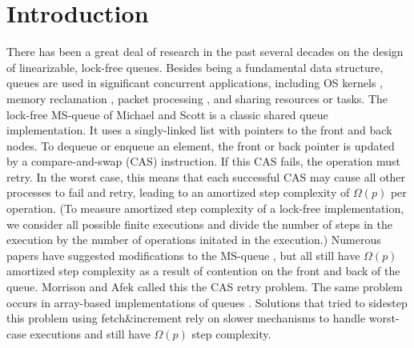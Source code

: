 
\section{Introduction}

There has been a great deal of research in the past several decades on the design of linearizable, lock-free queues.
Besides being a fundamental data structure, queues are used in
significant concurrent applications, including OS kernels \cite{MP91}, memory reclamation \cite{?},
packet processing \cite{DPDK},
and sharing resources or tasks.
The lock-free MS-queue of Michael and Scott \cite{MS98} is a classic shared queue implementation.
It uses a singly-linked list with pointers to the front and back nodes.
To dequeue or enqueue an element, the front or back pointer is updated by a 
compare-and-swap (CAS) instruction.
If this CAS fails, the operation must retry.
In the worst case, this means that each successful CAS may cause all other processes to
fail and retry, leading to an amortized step complexity of $\Omega(p)$ per operation.
(To measure amortized step complexity of a lock-free implementation, we consider all possible finite executions
and divide the number of steps in the execution by the number of operations initated in the execution.)
Numerous papers have suggested modifications to the MS-queue \cite{DBLP:conf/opodis/HoffmanSS07,DBLP:conf/podc/KoganH14,DBLP:conf/ppopp/KoganP11,DBLP:journals/dc/Ladan-MozesS08,MKLLP22,DBLP:conf/spaa/MoirNSS05,RC17}, but 
all still have $\Omega(p)$ amortized step complexity as a result of
contention on the front and back of the queue.
Morrison and Afek \cite{DBLP:conf/ppopp/MorrisonA13} called this the CAS retry problem.
The same problem occurs in array-based implementations of queues \cite{DBLP:conf/iceccs/ColvinG05,DBLP:conf/icdcn/Shafiei09,DBLP:conf/spaa/TsigasZ01,DBLP:conf/opodis/GidenstamST10}.
Solutions that tried to sidestep this problem using fetch\&increment \cite{DBLP:conf/ppopp/MorrisonA13,DBLP:conf/ppopp/YangM16,Nik19,10.1145/3490148.3538572}
rely on slower mechanisms to handle worst-case executions and still have $\Omega(p)$ step complexity.

